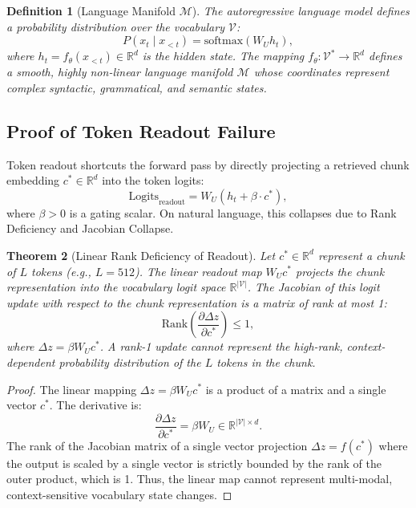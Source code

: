 \documentclass[11pt]{article}
\newtheorem{theorem}{Theorem}[section]
\newtheorem{definition}[theorem]{Definition}
\newcommand{\softmax}{\mathrm{softmax}}
\begin{document}
\begin{definition}[Language Manifold $\mathcal{M}$]
The autoregressive language model defines a probability distribution over the vocabulary $\mathcal{V}$:
\begin{equation}
P(x_t \mid x_{<t}) = \softmax(W_U h_t),
\end{equation}
where $h_t = f_\theta(x_{<t}) \in \mathbb{R}^d$ is the hidden state. The mapping $f_\theta: \mathcal{V}^* \to \mathbb{R}^d$ defines a smooth, highly non-linear language manifold $\mathcal{M}$ whose coordinates represent complex syntactic, grammatical, and semantic states.
\end{definition}

\subsection{Proof of Token Readout Failure}

Token readout shortcuts the forward pass by directly projecting a retrieved chunk embedding $c^* \in \mathbb{R}^d$ into the token logits:
\begin{equation}
\text{Logits}_{\text{readout}} = W_U (h_t + \beta \cdot c^*),
\end{equation}
where $\beta > 0$ is a gating scalar. On natural language, this collapses due to Rank Deficiency and Jacobian Collapse.

\begin{theorem}[Linear Rank Deficiency of Readout]
Let $c^* \in \mathbb{R}^d$ represent a chunk of $L$ tokens (e.g., $L = 512$). The linear readout map $W_U c^*$ projects the chunk representation into the vocabulary logit space $\mathbb{R}^{|\mathcal{V}|}$. The Jacobian of this logit update with respect to the chunk representation is a matrix of rank at most 1:
\begin{equation}
\text{Rank}\left( \frac{\partial \Delta z}{\partial c^*} \right) \leq 1,
\end{equation}
where $\Delta z = \beta W_U c^*$. A rank-1 update cannot represent the high-rank, context-dependent probability distribution of the $L$ tokens in the chunk.
\end{theorem}

\begin{proof}
The linear mapping $\Delta z = \beta W_U c^*$ is a product of a matrix and a single vector $c^*$. The derivative is:
\begin{equation}
\frac{\partial \Delta z}{\partial c^*} = \beta W_U \in \mathbb{R}^{|\mathcal{V}| \times d}.
\end{equation}
The rank of the Jacobian matrix of a single vector projection $\Delta z = f(c^*)$ where the output is scaled by a single vector is strictly bounded by the rank of the outer product, which is 1. Thus, the linear map cannot represent multi-modal, context-sensitive vocabulary state changes.
\end{proof}
\end{document}
